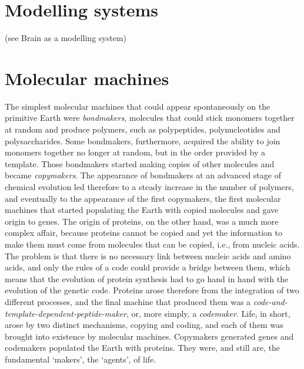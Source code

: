 \documentclass[12pt]{article}
\begin{document}
\section{Modelling systems} (see Brain as a modelling system)
 

\section{Molecular machines}
The simplest molecular machines that could appear spontaneously on the primitive Earth were \textit{bondmakers}, molecules that could stick monomers together at random and produce polymers, such as polypeptides, polynucleotides and polysaccharides. Some bondmakers, furthermore, acquired the ability to join monomers together no longer at random, but in the order provided by a template. Those bondmakers started making copies of other molecules and became \textit{copymakers}. The appearance of bondmakers at an advanced stage of chemical evolution led therefore to a steady increase in the number of polymers, and eventually to the appearance of the first copymakers, the first molecular machines that started populating the Earth with copied molecules and gave origin to genes. The origin of proteins, on the other hand, was a much more complex affair, because proteins cannot be copied and yet the information to make them must come from molecules that can be copied, i.e., from nucleic acids. The problem is that there is no necessary link between nucleic acids and amino acids, and only the rules of a code could provide a bridge between them, which means that the evolution of protein synthesis had to go hand in hand with the evolution of the genetic code. Proteins arose therefore from the integration of two different processes, and the final machine that produced them was a \textit{code-and-template-dependent-peptide-maker}, or, more simply, a \textit{codemaker}. Life, in short, arose by two distinct mechanisms, copying and coding, and each of them was brought into existence by molecular machines. Copymakers generated genes and codemakers populated the Earth with proteins. They were, and still are, the fundamental `makers', the `agents', of life.
\end{document}
